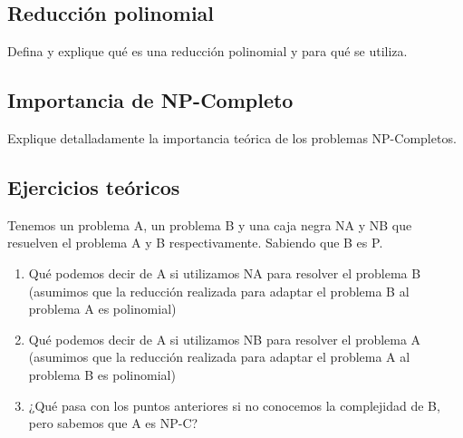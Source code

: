 \documentclass[titlepage,a4paper]{article}
\begin{document}
\setcounter{subsection}{0}%
\renewcommand{\thesubsection}{\arabic{subsection}}%

\newpage\subsection{Reducción polinomial}\label{sec:parte3_1}
\begin{tcolorbox}[colback=blue!5!white,colframe=blue!75!black,title=Enunciado P3.1]
    Defina y explique qué es una reducción polinomial y para qué se utiliza.
\end{tcolorbox}



\filbreak %
\subsection{Importancia de NP-Completo}\label{sec:parte3_2}
\begin{tcolorbox}[colback=blue!5!white,colframe=blue!75!black,title=Enunciado P3.2]
    Explique detalladamente la importancia teórica de los problemas NP-Completos.
\end{tcolorbox}



\newpage\subsection{Ejercicios teóricos}\label{sec:parte3_3}
\begin{tcolorbox}[colback=blue!5!white,colframe=blue!75!black,title=Enunciado P3.2]
    Tenemos un problema A, un problema B y una caja negra NA y NB que resuelven el
    problema A y B respectivamente. Sabiendo que B es P.\begin{enumerate}
        \item Qué podemos decir de A si utilizamos NA para resolver el problema B (asumimos que la reducción realizada para adaptar el problema B al problema A es polinomial)
        \item Qué podemos decir de A si utilizamos NB para resolver el problema A (asumimos que la reducción realizada para adaptar el problema A al problema B es polinomial)
        \item ¿Qué pasa con los puntos anteriores si no conocemos la complejidad de B, pero sabemos que A es NP-C?
    \end{enumerate}
\end{tcolorbox}





\end{document}
